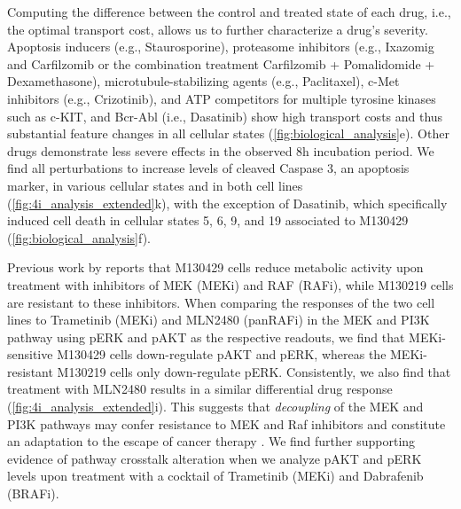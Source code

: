  Computing the difference between the control and treated state of each drug, i.e., the optimal
transport cost, allows us to further characterize a drug's severity. 
Apoptosis inducers (e.g., Staurosporine), proteasome inhibitors (e.g., Ixazomig and Carfilzomib or the combination treatment Carfilzomib + Pomalidomide + Dexamethasone), microtubule-stabilizing agents (e.g., Paclitaxel), c-Met inhibitors (e.g., Crizotinib), and ATP competitors for multiple tyrosine kinases such as c-KIT, and Bcr-Abl (i.e., Dasatinib) show high transport costs and thus substantial feature changes in all cellular states (\cref{fig:biological_analysis}e). Other drugs demonstrate less severe effects in the observed 8h incubation period. 
We find all perturbations to increase levels of cleaved Caspase 3, an apoptosis marker, in various cellular states and in both cell lines (\cref{fig:4i_analysis_extended}k), with the exception of Dasatinib, which specifically induced cell death in cellular states 5, 6, 9, and 19 associated to M130429 (\cref{fig:biological_analysis}f).

 Previous work by \citet{smith2016inhibiting} reports that M130429 cells reduce metabolic activity %
upon treatment with inhibitors of MEK (MEKi) and RAF (RAFi), while M130219 cells are resistant to these inhibitors. When comparing the responses of the two cell lines to Trametinib (MEKi) and MLN2480 (panRAFi) in the MEK and PI3K pathway using pERK and pAKT as the respective readouts, we find that MEKi-sensitive M130429 cells down-regulate pAKT and pERK, whereas the MEKi-resistant M130219 cells only down-regulate pERK. Consistently, we also find that treatment with MLN2480 results in a similar differential drug response (\cref{fig:4i_analysis_extended}i). This suggests that \textit{decoupling} of the MEK and PI3K pathways may confer resistance to MEK and Raf inhibitors and constitute an adaptation to the escape of cancer therapy \citep{kun2021mek}. We find further supporting evidence of pathway crosstalk alteration when we analyze pAKT and pERK levels upon treatment with a cocktail of Trametinib (MEKi) and Dabrafenib (BRAFi). 

